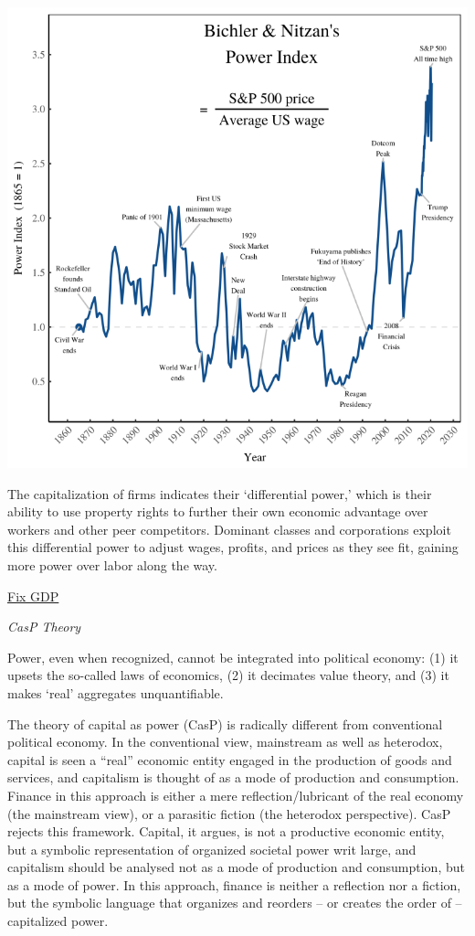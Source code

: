 \documentclass[
]{book}
\begin{document}
\includegraphics{fig/power_index.png}

The capitalization of firms indicates their `differential power,' which is their ability to use property rights to further their own economic advantage over workers and other peer competitors. Dominant classes and corporations exploit this differential power to adjust wages, profits, and prices as they see fit, gaining more power over labor along the way.

\href{https://economicsfromthetopdown.com/2019/12/15/why-we-should-abandon-real-gdp-as-a-measure-of-economic-activity/}{Fix GDP}

\emph{CasP Theory}

Power, even when recognized, cannot be integrated into political economy:
(1) it upsets the so-called laws of economics,
(2) it decimates value theory, and
(3) it makes `real' aggregates unquantifiable.

The theory of capital as power (CasP) is radically different from conventional political
economy.
In the conventional view, mainstream as well as heterodox, capital is seen a ``real'' economic
entity engaged in the production of goods and services, and capitalism is thought of as a
mode of production and consumption. Finance in this approach is either a mere
reflection/lubricant of the real economy (the mainstream view), or a parasitic fiction (the
heterodox perspective).
CasP rejects this framework. Capital, it argues, is not a productive economic entity, but a
symbolic representation of organized societal power writ large, and capitalism should be
analysed not as a mode of production and consumption, but as a mode of power. In this
approach, finance is neither a reflection nor a fiction, but the symbolic language that
organizes and reorders -- or creates the order of -- capitalized power.
\end{document}
